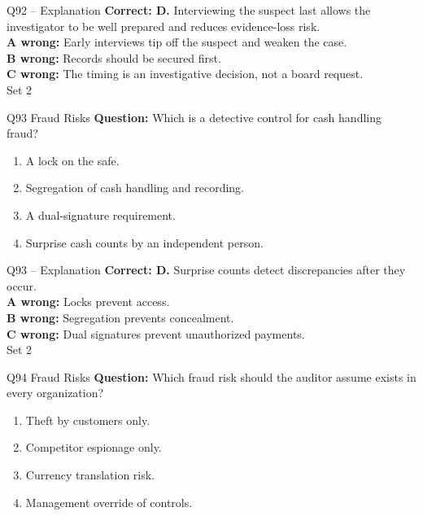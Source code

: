 \documentclass[aspectratio=169,10pt]{beamer}
\begin{document}
\begin{frame}[t]{Q92 -- Explanation}
	\footnotesize
	\textbf{Correct: D.} Interviewing the suspect last allows the investigator to be well prepared and reduces evidence-loss risk. \\[5pt]
\textbf{A wrong:} Early interviews tip off the suspect and weaken the case. \\[3pt]
\textbf{B wrong:} Records should be secured first. \\[3pt]
\textbf{C wrong:} The timing is an investigative decision, not a board request. \\[3pt]
	\vfill {\tiny Set 2}
\end{frame}

\begin{frame}[t]{Q93 \hfill {\scriptsize Fraud Risks}}
	\small
	\textbf{Question:} Which is a detective control for cash handling fraud?
	\begin{enumerate}[label=\Alph*.,itemsep=1pt,topsep=3pt]
			\item A lock on the safe.
			\item Segregation of cash handling and recording.
			\item A dual-signature requirement.
			\item Surprise cash counts by an independent person.
	\end{enumerate}
\end{frame}

\begin{frame}[t]{Q93 -- Explanation}
	\footnotesize
	\textbf{Correct: D.} Surprise counts detect discrepancies after they occur. \\[5pt]
\textbf{A wrong:} Locks prevent access. \\[3pt]
\textbf{B wrong:} Segregation prevents concealment. \\[3pt]
\textbf{C wrong:} Dual signatures prevent unauthorized payments. \\[3pt]
	\vfill {\tiny Set 2}
\end{frame}

\begin{frame}[t]{Q94 \hfill {\scriptsize Fraud Risks}}
	\small
	\textbf{Question:} Which fraud risk should the auditor assume exists in every organization?
	\begin{enumerate}[label=\Alph*.,itemsep=1pt,topsep=3pt]
			\item Theft by customers only.
			\item Competitor espionage only.
			\item Currency translation risk.
			\item Management override of controls.
	\end{enumerate}
\end{frame}
\end{document}

